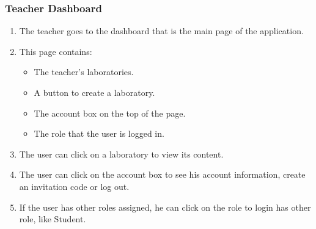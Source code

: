 \subsubsection{Teacher Dashboard}

\begin{enumerate}
    \item The teacher goes to the dashboard that is the main page of the application.
    \item This page contains:
    \begin{itemize}
        \item The teacher's laboratories. 
        \item A button to create a laboratory.
        \item The account box on the top of the page.
        \item The role that the user is logged in.
    \end{itemize}
    \item The user can click on a laboratory to view its content.
    \item The user can click on the account box to see his account information, create an invitation code or log out.
    \item If the user has other roles assigned, he can click on the role to login has other role, like Student.
\end{enumerate}

